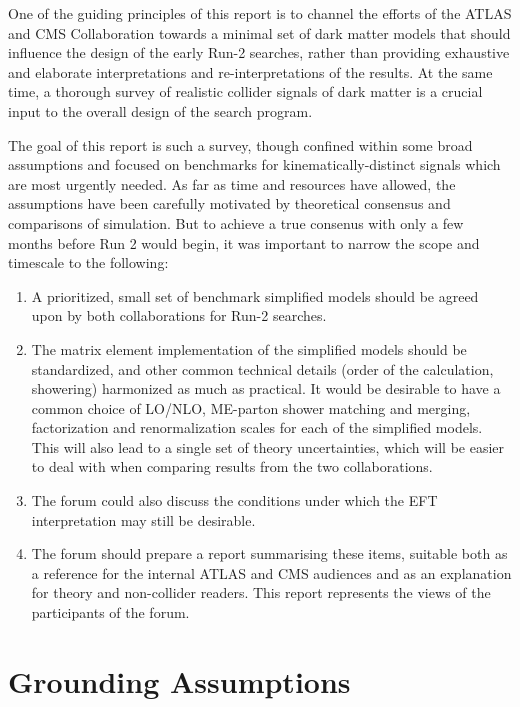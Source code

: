 One of the guiding principles of this report is to channel the efforts
of the ATLAS and CMS Collaboration towards a minimal set of dark
matter models that should influence the design of the early Run-2
searches, rather than providing exhaustive and elaborate
interpretations and re-interpretations of the results. At the same
time, a thorough survey of realistic collider signals of dark matter
is a crucial input to the overall design of the search program.

The goal of this report is such a survey, though confined within some
broad assumptions and focused on benchmarks for kinematically-distinct
signals which are most urgently needed. As far as time and resources
have allowed, the assumptions have been carefully motivated by
theoretical consensus and comparisons of simulation. But to achieve a
true consenus with only a few months before Run 2 would begin, it was
important to narrow the scope and timescale to the following:

\begin{enumerate}
\item A prioritized, small set of benchmark simplified models should
  be agreed upon by both collaborations for Run-2 searches.
\item The matrix element implementation of the simplified models
  should be standardized, and other common technical details (order of
  the calculation, showering) harmonized as much as practical. It
  would be desirable to have a common choice of LO/NLO, ME-parton
  shower matching and merging, factorization and renormalization
  scales for each of the simplified models. This will also lead to a
  single set of theory uncertainties, which will be easier to deal
  with when comparing results from the two collaborations.
\item The forum could also discuss the conditions under which the EFT
  interpretation may still be desirable.
\item The forum should prepare a report summarising these items,
  suitable both as a reference for the internal ATLAS and CMS
  audiences and as an explanation for theory and non-collider
  readers. This report represents the views of the participants of the
  forum.
\end{enumerate}

\section{Grounding Assumptions}


